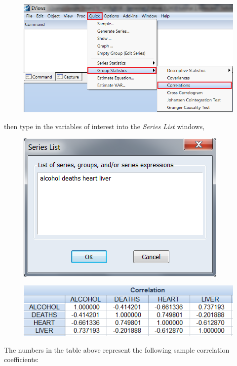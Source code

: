 \documentclass[12pt]{report}
\begin{document}
		\begin{figure}[H]
			\centerline{\includegraphics{q3_4}}
		\end{figure}		
		\vspace{-\baselineskip}		
		\noindent then type in the variables of interest into the \textit{Series List} windows,
		\begin{figure}[H]
			\centerline{\includegraphics{q2_3}}
		\end{figure}		
		\vspace{-\baselineskip}	
		\begin{figure}[H]
			\centering
			\includegraphics{corr2}
		\end{figure}
		\vspace{-\baselineskip}
		\newpage
		\noindent The numbers in the table above represent the following sample correlation coefficients:
\end{document}

